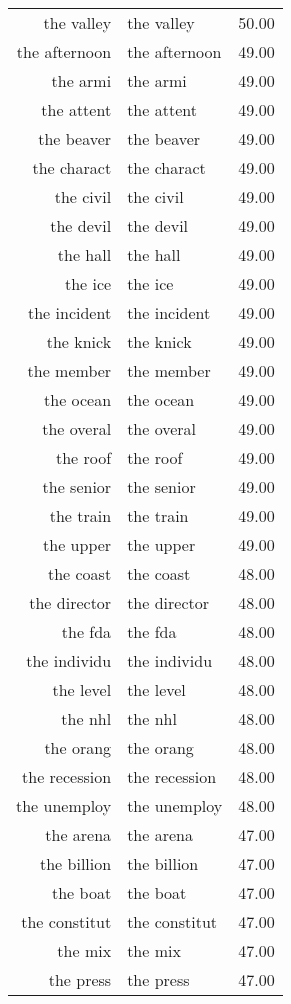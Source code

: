 \begin{table}[ht]
\begin{tabular}{rlr}
  the valley & the valley & 50.00 \\ 
  the afternoon & the afternoon & 49.00 \\ 
  the armi & the armi & 49.00 \\ 
  the attent & the attent & 49.00 \\ 
  the beaver & the beaver & 49.00 \\ 
  the charact & the charact & 49.00 \\ 
  the civil & the civil & 49.00 \\ 
  the devil & the devil & 49.00 \\ 
  the hall & the hall & 49.00 \\ 
  the ice & the ice & 49.00 \\ 
  the incident & the incident & 49.00 \\ 
  the knick & the knick & 49.00 \\ 
  the member & the member & 49.00 \\ 
  the ocean & the ocean & 49.00 \\ 
  the overal & the overal & 49.00 \\ 
  the roof & the roof & 49.00 \\ 
  the senior & the senior & 49.00 \\ 
  the train & the train & 49.00 \\ 
  the upper & the upper & 49.00 \\ 
  the coast & the coast & 48.00 \\ 
  the director & the director & 48.00 \\ 
  the fda & the fda & 48.00 \\ 
  the individu & the individu & 48.00 \\ 
  the level & the level & 48.00 \\ 
  the nhl & the nhl & 48.00 \\ 
  the orang & the orang & 48.00 \\ 
  the recession & the recession & 48.00 \\ 
  the unemploy & the unemploy & 48.00 \\ 
  the arena & the arena & 47.00 \\ 
  the billion & the billion & 47.00 \\ 
  the boat & the boat & 47.00 \\ 
  the constitut & the constitut & 47.00 \\ 
  the mix & the mix & 47.00 \\ 
  the press & the press & 47.00 \\ 

\end{tabular}
\end{table}
